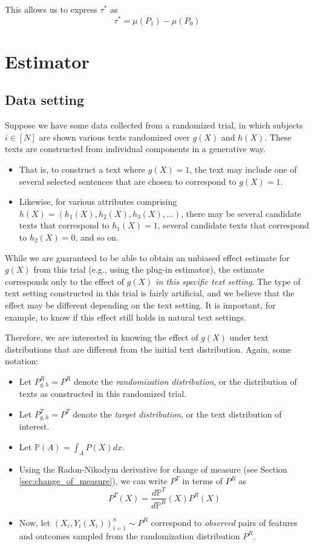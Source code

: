 \documentclass{article}
\begin{document}
This allows us to express $\tau^*$ as
\begin{equation*}
    \boxed{\tau^* = \mu(P_1)-\mu(P_0)}
\end{equation*}

\section{Estimator}

\subsection{Data setting}

Suppose we have some data collected from a randomized trial, in which subjects $i \in [N]$ are shown various texts randomized over $g(X)$ and $h(X)$. These texts are constructed from individual components in a generative way. 
\begin{itemize}
    \item That is, to construct a text where $g(X)=1$, the text may include one of several selected sentences that are chosen to correspond to $g(X)=1$.
    \item Likewise, for various attributes comprising $h(X)=(h_1(X), h_2(X), h_3(X), \dots)$, there may be several candidate texts that correspond to $h_1(X)=1$, several candidate texts that correspond to $h_2(X)=0$, and so on.
\end{itemize}

While we are guaranteed to be able to obtain an unbiased effect estimate for $g(X)$ from this trial (e.g., using the plug-in estimator), the estimate corresponds only to the effect of $g(X)$ \textit{in this specific text setting}. The type of text setting constructed in this trial is fairly artificial, and we believe that the effect may be different depending on the text setting. It is important, for example, to know if this effect still holds in natural text settings.

Therefore, we are interested in knowing the effect of $g(X)$ under text distributions that are different from the initial text distribution. Again, some notation:

\begin{itemize}
    \item Let $P^R_{g,h} = P^R$ denote the \textit{randomization distribution}, or the distribution of texts as constructed in this randomized trial.
    \item Let $P^T_{g,h} = P^T$ denote the \textit{target distribution}, or the text distribution of interest.
    \item Let $\mathbb{P}(A) = \int_A P(X) dx$.
    \item Using the Radon-Nikodym derivative for change of measure (see Section \ref{sec:change_of_measure}), we can write $P^T$ in terms of $P^R$ as
    \begin{equation*}
        P^T(X) = \frac{d\mathbb{P}^T}{d\mathbb{P}^R}(X)P^R(X)
    \end{equation*}
    \item Now, let $(X_i,Y_i(X_i))_{i=1}^n \sim P^R$ correspond to \textit{observed} pairs of features and outcomes sampled from the randomization distribution $P^R$.
\end{itemize}
\end{document}
